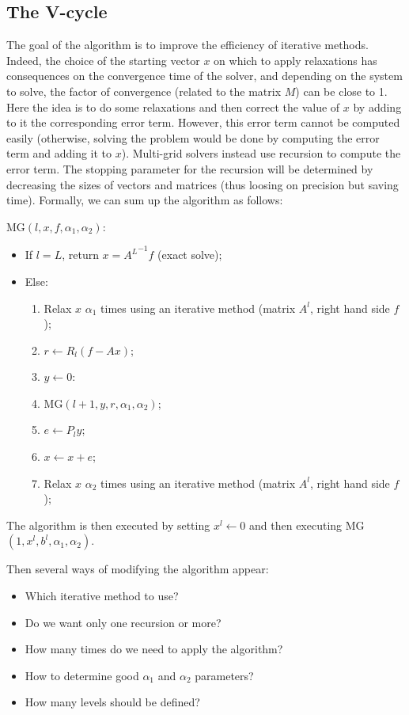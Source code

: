 \documentclass[sigplan]{acmart}
\begin{document}
\subsection{The V-cycle}

  The goal of the algorithm is to improve the efficiency of iterative methods. Indeed, the choice of the starting vector $x$ on which to apply relaxations has consequences on the convergence
  time of the solver, and depending on the system to solve, the factor of convergence (related to the matrix $M$) can be close to 1.\\
  Here the idea is to do some relaxations and then correct the value of $x$ by adding to it the corresponding error term. However, this error term cannot be computed easily (otherwise,
  solving the problem would be done by computing the error term and adding it to $x$). Multi-grid solvers instead use recursion to compute the error term. The stopping parameter for the
  recursion will be determined by decreasing the sizes of vectors and matrices (thus loosing on precision but saving time).
  Formally, we can sum up the algorithm as follows:
  
  MG$(l,x,f,\alpha_1,\alpha_2)$:
  \begin{itemize}
    \item If $l = L$, return $x = {A^L}^{-1} f$ (exact solve);
    \item Else:
    \begin{enumerate}
      \item Relax $x$ $\alpha_1$ times using an iterative method (matrix $A^l$, right hand side $f$);
      \item $r \leftarrow R_l ( f - Ax )$;
      \item $y \leftarrow 0$:
      \item MG$(l+1,y,r,\alpha_1,\alpha_2)$;
      \item $e \leftarrow P_{l} y$;
      \item $x \leftarrow x+e$;
      \item Relax $x$ $\alpha_2$ times using an iterative method (matrix $A^l$, right hand side $f$);
   \end{enumerate}
  \end{itemize}
  The algorithm is then executed by setting $x^l \leftarrow 0$ and then executing MG$(1,x^l,b^l,\alpha_1,\alpha_2)$.

  Then several ways of modifying the algorithm appear:
  \begin{itemize}
   \item Which iterative method to use?
   \item Do we want only one recursion or more?
   \item How many times do we need to apply the algorithm?
   \item How to determine good $\alpha_1$ and $\alpha_2$ parameters?
   \item How many levels should be defined?
  \end{itemize}
\end{document}
